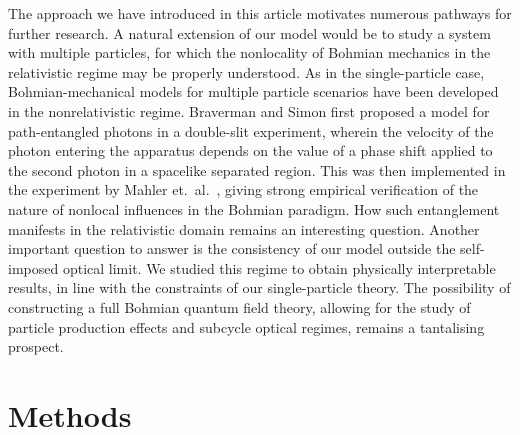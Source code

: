 \documentclass[
prx
,twocolumn
,nofootinbib
,floatfix
,superscriptaddress
]{revtex4-2}
\begin{document}
The approach we have introduced in this article motivates numerous pathways for further research. A natural extension of our model would be to study a system with multiple particles, for which the nonlocality of Bohmian mechanics in the relativistic regime may be properly understood. As in the single-particle case, Bohmian-mechanical models for multiple particle scenarios have been developed in the nonrelativistic regime. Braverman and Simon \cite{bravermanPhysRevLett.110.060406} first proposed a model for path-entangled photons in a double-slit experiment, wherein the velocity of the photon entering the apparatus depends on the value of a phase shift applied to the second photon in a spacelike separated region. This was then implemented in the experiment by Mahler et.\ al.\ \cite{mahler2016experimental}, giving strong empirical verification of the nature of nonlocal influences in the Bohmian paradigm. How such entanglement manifests in the relativistic domain remains an interesting question. Another important question to answer is the consistency of our model outside the self-imposed optical limit. We studied this regime to obtain physically interpretable results, in line with the constraints of our single-particle theory. The possibility of constructing a full Bohmian quantum field theory, allowing for the study of particle production effects and subcycle optical regimes, remains a tantalising prospect.   

\section{Methods}
\end{document}
